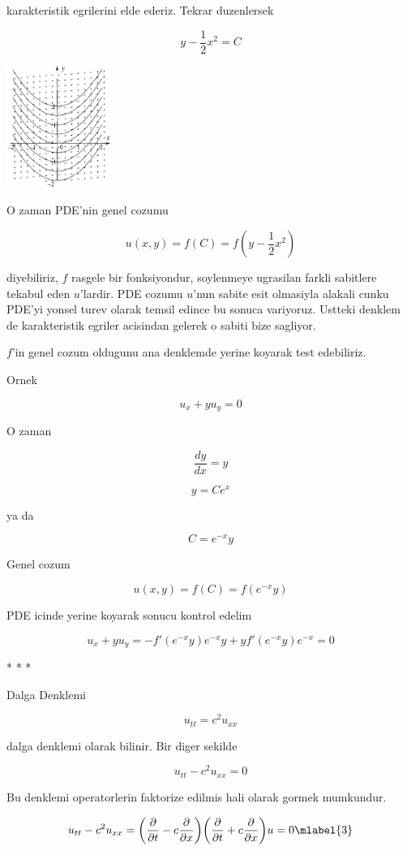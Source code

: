 \documentclass[12pt,fleqn]{article}\usepackage{../common}
\begin{document}
karakteristik egrilerini elde ederiz. Tekrar duzenlersek

\[ y - \frac{1}{2}x^2 = C \]

\includegraphics[height=4cm]{2_1.png}

O zaman PDE'nin genel cozumu 

\[ u(x,y) = f(C) = f(y - \frac{1}{2}x^2) \]

diyebiliriz, $f$ rasgele bir fonksiyondur, soylenmeye ugrasilan farkli
sabitlere tekabul eden $u$'lardir. PDE cozumu $u$'nun sabite esit olmasiyla
alakali cunku PDE'yi yonsel turev olarak temsil edince bu sonuca
variyoruz. Ustteki denklem de karakteristik egriler acisindan gelerek o
sabiti bize sagliyor.

$f$'in genel cozum oldugunu ana denklemde yerine koyarak test edebiliriz.

Ornek 

\[ u_x + yu_y = 0 \]

O zaman 

\[ \frac{dy}{dx} = y \]

\[ y = Ce^x \]

ya da

\[  C = e^{-x}y\]

Genel cozum 

\[ u(x,y) = f(C) = f(e^{-x}y) \]

PDE icinde yerine koyarak sonucu kontrol edelim

\[ u_x + yu_y = 
-f'(e^{-x}y)e^{-x}y + y f'(e^{-x}y) e^{-x} = 0
 \]

* * *

Dalga Denklemi 

\[ u_{tt} = c^2 u_{xx} \]

dalga denklemi olarak bilinir. Bir diger sekilde 

\[ u_{tt} - c^2 u_{xx} = 0\]

Bu denklemi operatorlerin faktorize edilmis hali olarak gormek mumkundur. 

\[ u_{tt} - c^2 u_{xx} = 
\bigg( \frac{\partial }{\partial t} - c \frac{\partial }{\partial x} \bigg)
\bigg( \frac{\partial }{\partial t} + c \frac{\partial }{\partial x} \bigg)
u = 0
\mlabel{3}
\]
\end{document}
